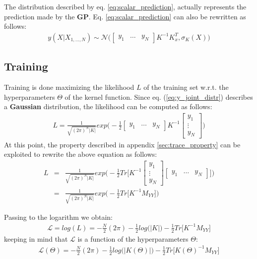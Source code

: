 \documentclass{article}
\begin{document}
The distribution described by eq. \ref{eq:scalar_prediction}, actually represents the prediction made by the \textbf{GP}. Eq. \ref{eq:scalar_prediction} can also be rewritten as follows:
\begin{eqnarray}
y(X | X_{1,\hdots,N}) 
\sim \mathcal{N} \bigg (
\begin{bmatrix} y_1 & \hdots & y_N \end{bmatrix}
K^{-1} K_x^T, 
\sigma_K(X)
\bigg ) 
\end{eqnarray}

\subsection{Training}
\label{sec:train_scalar}

Training is done maximizing the likelihood $L$ of the training set w.r.t. the hyperparameters $\Theta$ of the kernel function.
Since eq. (\ref{eq:y_joint_distr}) describes a \textbf{Gaussian} distribution, the likelihood can be computed as follows:
\begin{eqnarray}
L = 
\frac{1}{\sqrt{(2 \pi)^N \left | K \right | }}
exp \bigg ( - \frac{1}{2}
\begin{bmatrix} y_1 & \hdots & y_N \end{bmatrix} 
K^{-1}
\begin{bmatrix} y_1 \\ \vdots \\ y_N \end{bmatrix} 
\bigg ) 
\end{eqnarray}
At this point, the property described in appendix \ref{sec:trace_property} can be exploited to rewrite the above equation as follows:
\begin{eqnarray}
L &=& 
\frac{1}{\sqrt{(2 \pi)^N \left | K \right | }}
exp \bigg ( - \frac{1}{2}
Tr \bigg [ 
K^{-1}
\begin{bmatrix} y_1 \\ \vdots \\ y_N \end{bmatrix} 
\begin{bmatrix} y_1 & \hdots & y_N \end{bmatrix} 
\bigg ]
\bigg ) \\
&=&
\frac{1}{\sqrt{(2 \pi)^N \left | K \right | }}
exp \bigg ( - \frac{1}{2}
Tr \bigg [ 
K^{-1}
M_{YY}
\bigg ]
\bigg )
\end{eqnarray}

Passing to the logarithm we obtain:
\begin{eqnarray}
\mathcal{L} = log(L) = 
-\frac{N}{2}(2 \pi) 
-\frac{1}{2} log \big (\left | K \right | \big )
-\frac{1}{2} Tr \bigg [
K^{-1} M_{YY}
\bigg ] 
\end{eqnarray}
keeping in mind that $\mathcal{L}$ is a function of the hyperparameters $\Theta$:
\begin{eqnarray}
\mathcal{L}(\Theta) = 
-\frac{N}{2}(2 \pi) 
-\frac{1}{2} log \big (\left | K(\Theta) \right | \big )
-\frac{1}{2} Tr \bigg [
K(\Theta)^{-1} M_{YY}
\bigg ] 
\end{eqnarray}
\end{document}

